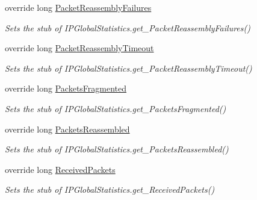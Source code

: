 \begin{DoxyCompactItemize}
override long \hyperlink{class_system_1_1_net_1_1_network_information_1_1_fakes_1_1_stub_i_p_global_statistics_ae785f2e2c52dfd34e5f14529aee6017f}{Packet\-Reassembly\-Failures}
\begin{DoxyCompactList}\small\item\em Sets the stub of I\-P\-Global\-Statistics.\-get\-\_\-\-Packet\-Reassembly\-Failures()\end{DoxyCompactList}\item 
override long \hyperlink{class_system_1_1_net_1_1_network_information_1_1_fakes_1_1_stub_i_p_global_statistics_aecec19242321e1a287325286341d97d4}{Packet\-Reassembly\-Timeout}
\begin{DoxyCompactList}\small\item\em Sets the stub of I\-P\-Global\-Statistics.\-get\-\_\-\-Packet\-Reassembly\-Timeout()\end{DoxyCompactList}\item 
override long \hyperlink{class_system_1_1_net_1_1_network_information_1_1_fakes_1_1_stub_i_p_global_statistics_acb133f6bd1e974378d75db0eec634fad}{Packets\-Fragmented}
\begin{DoxyCompactList}\small\item\em Sets the stub of I\-P\-Global\-Statistics.\-get\-\_\-\-Packets\-Fragmented()\end{DoxyCompactList}\item 
override long \hyperlink{class_system_1_1_net_1_1_network_information_1_1_fakes_1_1_stub_i_p_global_statistics_af6addddab9e6d43d5a99059c5835a6b4}{Packets\-Reassembled}
\begin{DoxyCompactList}\small\item\em Sets the stub of I\-P\-Global\-Statistics.\-get\-\_\-\-Packets\-Reassembled()\end{DoxyCompactList}\item 
override long \hyperlink{class_system_1_1_net_1_1_network_information_1_1_fakes_1_1_stub_i_p_global_statistics_acb691d7c74a8d3fa15c1301499679de2}{Received\-Packets}
\begin{DoxyCompactList}\small\item\em Sets the stub of I\-P\-Global\-Statistics.\-get\-\_\-\-Received\-Packets()\end{DoxyCompactList}\item 

\end{DoxyCompactItemize}
